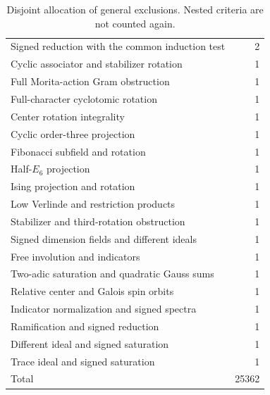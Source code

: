 \begin{table}[p]
\begin{tabular}{lr}
Signed reduction with the common induction test & 2\\
Cyclic associator and stabilizer rotation & 1\\
Full Morita-action Gram obstruction & 1\\
Full-character cyclotomic rotation & 1\\
Center rotation integrality & 1\\
Cyclic order-three projection & 1\\
Fibonacci subfield and rotation & 1\\
Half-$E_6$ projection & 1\\
Ising projection and rotation & 1\\
Low Verlinde and restriction products & 1\\
Stabilizer and third-rotation obstruction & 1\\
Signed dimension fields and different ideals & 1\\
Free involution and indicators & 1\\
Two-adic saturation and quadratic Gauss sums & 1\\
Relative center and Galois spin orbits & 1\\
Indicator normalization and signed spectra & 1\\
Ramification and signed reduction & 1\\
Different ideal and signed saturation & 1\\
Trace ideal and signed saturation & 1\\
\midrule
Total & 25362\\
\bottomrule\end{tabular}
\caption{Disjoint allocation of general exclusions. Nested criteria are not counted again.}\label{tab:allocation}
\end{table}
